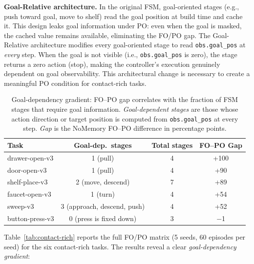 \textbf{Goal-Relative architecture.}
In the original FSM, goal-oriented stages (e.g., push toward goal, move to shelf) read the goal position at build time and cache it. This design leaks goal information under PO: even when the goal is masked, the cached value remains available, eliminating the FO/PO gap. The Goal-Relative architecture modifies every goal-oriented stage to read \texttt{obs.goal\_pos} at \emph{every} step. When the goal is not visible (i.e., \texttt{obs.goal\_pos} is zero), the stage returns a zero action (stop), making the controller's execution genuinely dependent on goal observability. This architectural change is necessary to create a meaningful PO condition for contact-rich tasks.



\begin{table}[t]
\centering
\caption{Goal-dependency gradient: FO--PO gap correlates with the fraction of FSM stages that require goal information. \emph{Goal-dependent stages} are those whose action direction or target position is computed from \texttt{obs.goal\_pos} at every step. \emph{Gap} is the NoMemory FO--PO difference in percentage points.}
\label{tab:goal-dependency}
\begin{tabular}{@{}lccc@{}}
\toprule
Task & Goal-dep.\ stages & Total stages & FO--PO Gap \\
\midrule
drawer-open-v3 & 1 (pull) & 4 & +100 \\
door-open-v3 & 1 (pull) & 4 & +90 \\
shelf-place-v3 & 2 (move, descend) & 7 & +89 \\
faucet-open-v3 & 1 (turn) & 4 & +54 \\
sweep-v3 & 3 (approach, descend, push) & 4 & +52 \\
button-press-v3 & 0 (press is fixed down) & 3 & $-$1 \\
\bottomrule
\end{tabular}
\end{table}

Table~\ref{tab:contact-rich} reports the full FO/PO matrix (5 seeds, 60 episodes per seed) for the six contact-rich tasks. The results reveal a clear \emph{goal-dependency gradient}:

